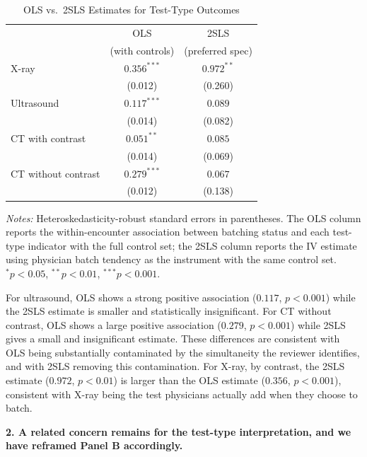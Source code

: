 \documentclass[11pt]{article}
\newcommand{\1}{\hbox{\rm 1\kern-.35em 1}}
\begin{document}
\begin{table}[h!]
\centering
\caption{OLS vs.\ 2SLS Estimates for Test-Type Outcomes}
\label{tab:ols_vs_iv_testtypes}
\begin{threeparttable}
\begin{tabular}{lcc}
\toprule
& OLS & 2SLS \\
& (with controls) & (preferred spec) \\
\midrule
X-ray             & $0.356^{***}$ & $0.972^{**}$ \\
                  & (0.012)       & (0.260) \\[0.3em]
Ultrasound        & $0.117^{***}$ & $0.089$ \\
                  & (0.014)       & (0.082) \\[0.3em]
CT with contrast  & $0.051^{**}$  & $0.085$ \\
                  & (0.014)       & (0.069) \\[0.3em]
CT without contrast & $0.279^{***}$ & $0.067$ \\
                  & (0.012)       & (0.138) \\
\bottomrule
\end{tabular}
\begin{flushleft}
\footnotesize
\textit{Notes:} Heteroskedasticity-robust standard errors in parentheses. The OLS column reports the within-encounter association between batching status and each test-type indicator with the full control set; the 2SLS column reports the IV estimate using physician batch tendency as the instrument with the same control set.  $^{*}p<0.05$, $^{**}p<0.01$, $^{***}p<0.001$.
\end{flushleft}
\end{threeparttable}
\end{table}

For ultrasound, OLS shows a strong positive association ($0.117$, $p<0.001$) while the 2SLS estimate is smaller and statistically insignificant. For CT without contrast, OLS shows a large positive association ($0.279$, $p<0.001$) while 2SLS gives a small and insignificant estimate. These differences are consistent with OLS being substantially contaminated by the simultaneity the reviewer identifies, and with 2SLS removing this contamination. For X-ray, by contrast, the 2SLS estimate ($0.972$, $p<0.01$) is larger than the OLS estimate ($0.356$, $p<0.001$), consistent with X-ray being the test physicians actually add when they choose to batch.

\textbf{2. A related concern remains for the test-type interpretation, and we have reframed Panel B accordingly.}
\end{document}
